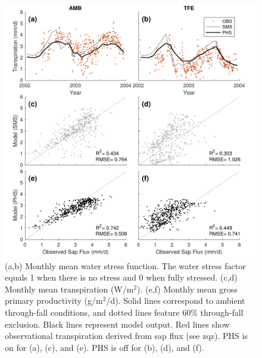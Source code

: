 \documentclass[draft,linenumbers]{agujournal}
\begin{document}
  \clearpage   
  \begin{figure}[h]
     \centering
     \includegraphics[width=30pc]{../figs3/T.pdf}
     \caption{(a,b) Monthly mean water stress function. The water stress factor equals 1 when there is no stress and 0 when fully stressed.
     (c,d) Monthly mean transpiration (W/m$^2$).
     (e,f) Monthly mean gross primary productivity (g/m$^2$/d). 
     Solid lines correspond to ambient through-fall conditions, and dotted lines feature 60\% through-fall exclusion.
     Black lines represent model output.
     Red lines show observational transpiration derived from sap flux (see zqz).
     PHS is on for (a), (c), and (e). PHS is off for (b), (d), and (f).
     }
     \label{fig:t}
  \end{figure}
  

  
  
\end{document}
